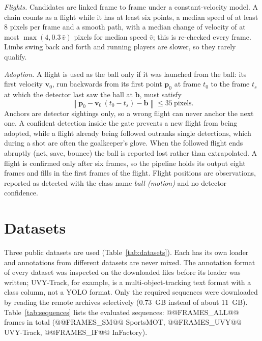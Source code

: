 \documentclass[conference]{IEEEtran}
\begin{document}
\emph{Flights.} Candidates are linked frame to frame under a constant-velocity
model. A chain counts as a flight while it has at least six points, a median
speed of at least 8 pixels per frame and a smooth path, with a median change of
velocity of at most $\max(4, 0.3\,\bar{v})$ pixels for median speed $\bar{v}$;
this is re-checked every frame. Limbs swing back and forth and running players are
slower, so they rarely qualify.

\emph{Adoption.} A flight is used as the ball only if it was launched from the
ball: its first velocity $\mathbf{v}_{0}$, run backwards from its first point
$\mathbf{p}_{0}$ at frame $t_{0}$ to the frame $t_{s}$ at which the detector last
saw the ball at $\mathbf{b}$, must satisfy
\begin{equation}
\left\lVert \mathbf{p}_{0}-\mathbf{v}_{0}\,(t_{0}-t_{s})-\mathbf{b}\right\rVert \le 35~\text{pixels}.
\label{eq:launch}
\end{equation}
Anchors are detector sightings only, so a wrong flight can never anchor the next
one. A confident detection inside the gate prevents a new flight from being
adopted, while a flight already being followed outranks single detections, which
during a shot are often the goalkeeper's glove. When the followed flight ends
abruptly (net, save, bounce) the ball is reported lost rather than extrapolated. A
flight is confirmed only after six frames, so the pipeline holds its output eight
frames and fills in the first frames of the flight. Flight positions are
observations, reported as detected with the class name \emph{ball (motion)} and no
detector confidence.

\section{Datasets}
\label{sec:datasets}
Three public datasets are used (Table~\ref{tab:datasets}). Each has its own
loader and annotations from different datasets are never mixed. The annotation
format of every dataset was inspected on the downloaded files before its loader
was written; UVY-Track, for example, is a multi-object-tracking text format with
a class column, not a YOLO format. Only the required sequences were downloaded by
reading the remote archives selectively (0.73~GB instead of about 11~GB).
Table~\ref{tab:sequences} lists the evaluated sequences: @@FRAMES_ALL@@ frames in
total (@@FRAMES_SM@@ SportsMOT, @@FRAMES_UVY@@ UVY-Track, @@FRAMES_IF@@ InFactory).
\end{document}

